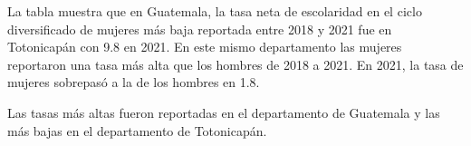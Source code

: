 La tabla muestra que en Guatemala, la tasa neta de escolaridad en el ciclo diversificado de mujeres más baja reportada entre 2018 y 2021 fue en Totonicapán con 9.8 en 2021. En este mismo departamento las mujeres reportaron una tasa más alta que los hombres de 2018 a 2021. En 2021, la tasa de mujeres sobrepasó a la de los hombres en 1.8. 

Las tasas más altas fueron reportadas en el departamento de Guatemala y las más bajas en el departamento de Totonicapán. 